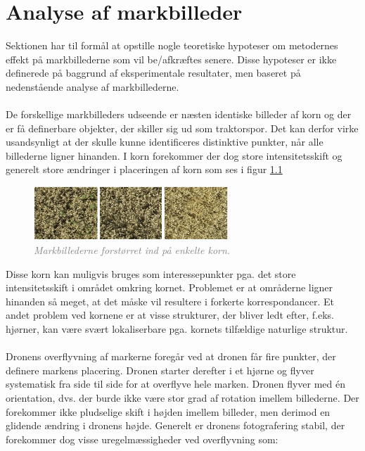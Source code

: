 \chapter{Analyse af markbilleder} \label{sec:mark}
Sektionen har til formål at opstille nogle teoretiske hypoteser om metodernes effekt på markbillederne som vil be/afkræftes senere. Disse hypoteser er ikke definerede på baggrund af eksperimentale resultater, men baseret på nedenstående analyse af markbillederne. \\ \\
De forskellige markbilleders udseende er næsten identiske billeder af korn og der er få definerbare objekter, der skiller sig ud som traktorspor. Det kan derfor virke usandsynligt at der skulle kunne identificeres distinktive punkter, når alle billederne ligner hinanden. I korn forekommer der dog store intensitetsskift og generelt store ændringer i placeringen af korn som ses i figur \ref{fig:korn}
\begin{figure}[H]
    \centering
    \includegraphics[width=0.65\textwidth]{fig/20.png}
     \vspace{-1em}
    \begin{center}    
       \caption{\textcolor{gray}{\footnotesize \textit{Markbillederne forstørret ind på enkelte korn.}}}
    \label{fig:korn}
     \end{center}
     \vspace{-2.5em}
  \end{figure} \noindent
Disse korn kan muligvis bruges som interessepunkter pga. det store intensitetsskift i området omkring kornet. Problemet er at områderne ligner hinanden så meget, at det måske vil resultere i forkerte korrespondancer. Et andet problem ved kornene er at visse strukturer, der bliver ledt efter, f.eks. hjørner, kan være svært lokaliserbare pga. kornets tilfældige naturlige struktur. \\ \\
Dronens overflyvning af markerne foregår ved at dronen får fire punkter, der definere markens placering. Dronen starter derefter i et hjørne og flyver systematisk fra side til side for at overflyve hele marken. Dronen flyver med én orientation, dvs. der burde ikke være stor grad af rotation imellem billederne. Der forekommer ikke pludselige skift i højden imellem billeder, men derimod en glidende ændring i dronens højde. Generelt er dronens fotografering stabil, der forekommer dog visse uregelmæssigheder ved overflyvning som:
